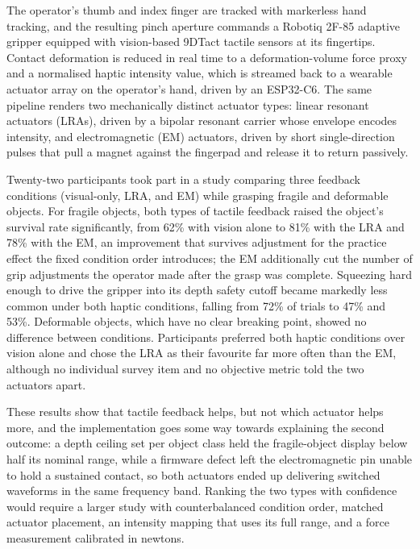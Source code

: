 \documentclass[12pt, a4paper, twoside, openright]{report}
\begin{document}
The operator's thumb and index finger are tracked with markerless hand
tracking, and the resulting pinch aperture commands a Robotiq 2F-85 adaptive
gripper equipped with vision-based 9DTact tactile sensors at its fingertips.
Contact deformation is reduced in real time to a deformation-volume force
proxy and a normalised haptic intensity value, which is streamed back to a
wearable actuator array on the operator's hand, driven by an ESP32-C6. The
same pipeline renders two mechanically distinct actuator types: linear
resonant actuators (LRAs), driven by a bipolar resonant carrier whose envelope
encodes intensity, and electromagnetic (EM) actuators, driven by short
single-direction pulses that pull a magnet against the fingerpad and release it
to return passively.

Twenty-two participants took part in a study comparing three feedback
conditions (visual-only, LRA, and EM) while grasping fragile and deformable
objects. For fragile objects, both types of tactile feedback raised the
object's survival rate significantly, from 62\% with vision alone to 81\% with
the LRA and 78\% with the EM, an improvement that survives adjustment for the
practice effect the fixed condition order introduces; the EM additionally cut
the number of grip adjustments the operator made after the grasp was complete.
Squeezing hard enough to drive the gripper into its depth safety cutoff became
markedly less common under both haptic conditions, falling from 72\% of trials
to 47\% and 53\%. Deformable objects, which have no clear breaking point,
showed no difference between conditions. Participants preferred both haptic
conditions over vision alone and chose the LRA as their favourite far more
often than the EM, although no individual survey item and no objective metric
told the two actuators apart.

These results show that tactile feedback helps, but not which actuator helps
more, and the implementation goes some way towards explaining the second
outcome: a depth ceiling set per object class held the fragile-object display
below half its nominal range, while a firmware defect left the electromagnetic
pin unable to hold a sustained contact, so both actuators ended up delivering
switched waveforms in the same frequency band. Ranking the two types with
confidence would require a larger study with counterbalanced condition order,
matched actuator placement, an intensity mapping that uses its full range, and
a force measurement calibrated in newtons.

\cleardoublepage
\end{document}
